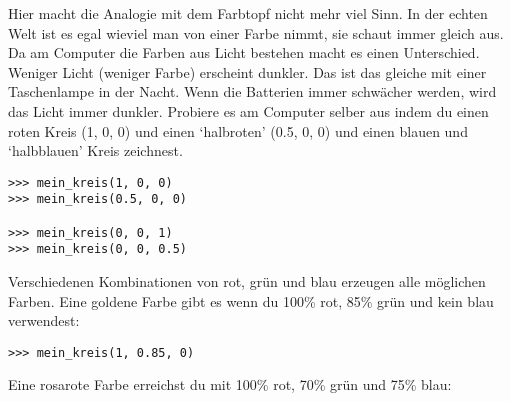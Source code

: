 Hier macht die Analogie mit dem Farbtopf nicht mehr viel Sinn. In der echten Welt ist es egal wieviel man von einer Farbe nimmt, sie schaut immer gleich aus. Da am Computer die Farben aus Licht bestehen macht es einen Unterschied. Weniger Licht (weniger Farbe) erscheint dunkler. Das ist das gleiche mit einer Taschenlampe in der Nacht. Wenn die Batterien immer schwächer werden, wird das Licht immer dunkler. Probiere es am Computer selber aus indem du einen roten Kreis (1, 0, 0) und einen `halbroten' (0.5, 0, 0) und einen blauen und `halbblauen' Kreis zeichnest.


\begin{Verbatim}[frame=single]
>>> mein_kreis(1, 0, 0)
>>> mein_kreis(0.5, 0, 0)

>>> mein_kreis(0, 0, 1)
>>> mein_kreis(0, 0, 0.5)
\end{Verbatim}

\noindent
Verschiedenen Kombinationen von rot, grün und blau erzeugen alle möglichen Farben. Eine goldene Farbe gibt es wenn du 100\% rot, 85\% grün und kein blau verwendest:

\begin{Verbatim}[frame=single]
>>> mein_kreis(1, 0.85, 0)
\end{Verbatim}

\noindent
Eine rosarote Farbe erreichst du mit 100\% rot, 70\% grün und 75\% blau:

